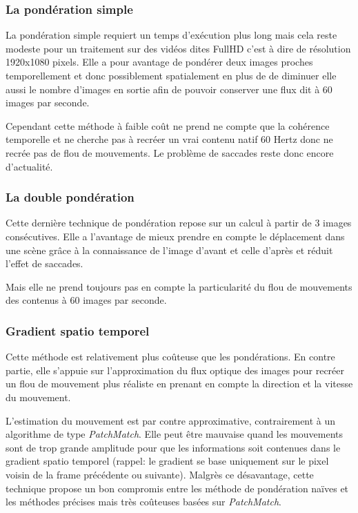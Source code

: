 \documentclass[fleqn,10pt]{SelfArx} %
\begin{document}
\subsubsection{La pondération simple}
La pondération simple requiert un temps d'exécution plus long mais cela reste modeste pour un traitement sur des vidéos dites \og FullHD \fg{} c'est à dire de résolution 1920x1080 pixels. Elle a pour avantage de pondérer deux images proches temporellement et donc possiblement spatialement en plus de de diminuer elle aussi le nombre d'images en sortie afin de pouvoir conserver une flux dit à 60 images par seconde.

Cependant cette méthode à faible coût ne prend ne compte que la cohérence temporelle et ne cherche pas à recréer un vrai contenu natif 60 Hertz donc ne recrée pas de flou de mouvements. Le problème de saccades reste donc encore d'actualité.

\subsubsection{La double pondération}
Cette dernière technique de pondération repose sur un calcul à partir de 3 images consécutives. Elle a l'avantage de mieux prendre en compte le déplacement dans une scène grâce à la connaissance de l'image d'avant et celle d'après et réduit l'effet de saccades.

Mais elle ne prend toujours pas en compte la particularité du flou de mouvements des contenus à 60 images par seconde.

\subsubsection{Gradient spatio temporel}
Cette méthode est relativement plus coûteuse que les pondérations. En contre partie, elle s'appuie sur
l'approximation du flux optique des images pour recréer un flou de mouvement plus réaliste en prenant en
compte la direction et la vitesse du mouvement.

L'estimation du mouvement est par contre approximative, contrairement à un algorithme de type {\em PatchMatch}.
Elle peut être mauvaise quand les mouvements sont de trop grande amplitude pour que les informations soit contenues dans 
le gradient spatio temporel (rappel: le gradient se base uniquement sur le pixel voisin de la frame précédente
ou suivante). Malgrès ce désavantage, cette technique propose un bon compromis entre les méthode de
pondération naïves et les méthodes précises mais très coûteuses basées sur {\em PatchMatch}.
\end{document}
